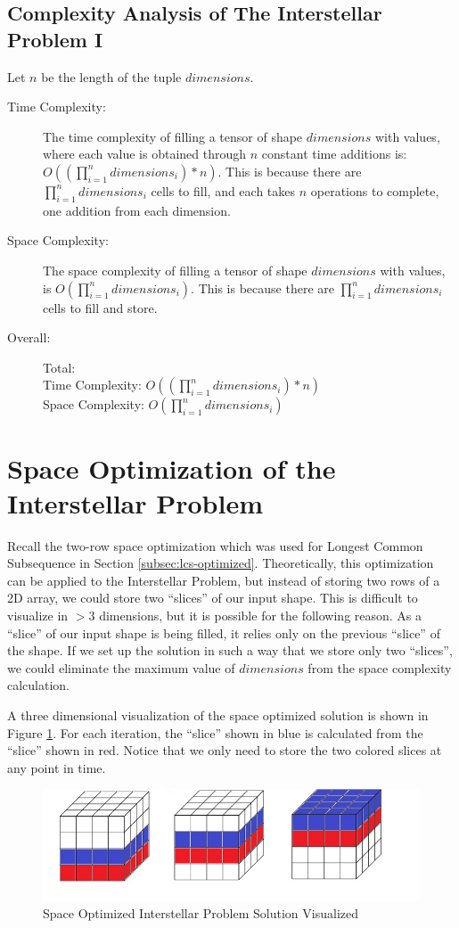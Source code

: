 \subsection{Complexity Analysis of The Interstellar Problem I}
Let $n$ be the length of the tuple $dimensions$.
\begin{description}
    \item[Time Complexity:]
        The time complexity of filling a tensor of shape $dimensions$ with values,
        where each value is obtained through $n$ constant time additions is:\\$O((\prod_{i=1}^{n} dimensions_i) * n)$. This is because there are $\prod_{i=1}^{n} dimensions_i$ cells to fill, and each takes $n$ operations to complete, one addition from each dimension.
        
    \item[Space Complexity:] 
    The space complexity of filling a tensor of shape $dimensions$ with values,
    is $O(\prod_{i=1}^{n} dimensions_i)$.
    This is because there are $\prod_{i=1}^{n} dimensions_i$ cells to fill and store.
    
    \item[Overall:] Total:\\
        Time Complexity: $O((\prod_{i=1}^{n} dimensions_i) * n)$\\
        Space Complexity: $O(\prod_{i=1}^{n} dimensions_i)$

\end{description}

\section{Space Optimization of the Interstellar Problem}
Recall the two-row space optimization which was used for Longest Common Subsequence in Section \ref{subsec:lcs-optimized}.
Theoretically, this optimization can be applied to the Interstellar Problem, but instead of storing two rows of a 2D array,
we could store two ``slices'' of our input shape.
This is difficult to visualize in $>3$ dimensions, but it is possible for the following reason. As a ``slice'' of our input shape is being filled, it relies only on the previous ``slice'' of the shape.
If we set up the solution in such a way that we store only two ``slices'', we could eliminate the maximum value of $dimensions$ from the space complexity calculation.

A three dimensional visualization of the space optimized solution is shown in Figure \ref{fig:interstellar-optimization}.
For each iteration, the ``slice'' shown in blue is calculated from the ``slice'' shown in red. Notice that we only need to store the two colored slices at any point in time.

\begin{figure}[H]
    \centering
    \includegraphics[width=0.8\linewidth]{visualization.jpg}
    \caption{Space Optimized Interstellar Problem Solution Visualized}
    \label{fig:interstellar-optimization}
\end{figure}